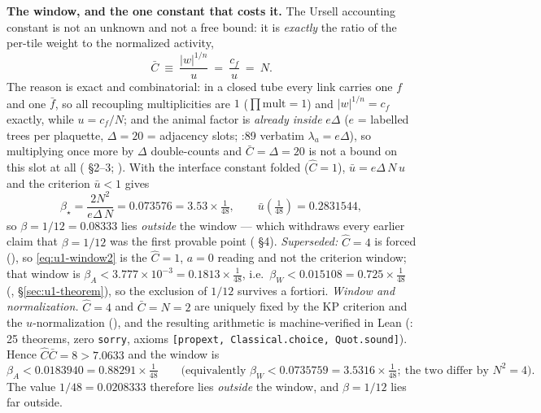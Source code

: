\begin{v2box}
\textbf{The window, and the one constant that costs it.} The Ursell accounting constant is not an
unknown and not a free bound: it is \emph{exactly} the ratio of the per-tile weight to the
normalized activity,
\begin{equation}
\bar C\ \equiv\ \frac{|w|^{1/n}}{u}\ =\ \frac{c_f}{u}\ =\ N .
\label{eq:u1-cbarN}
\end{equation}
The reason is exact and combinatorial: in a closed tube every link carries one $f$ and one $\bar
f$, so all recoupling multiplicities are $1$ ($\prod\mathrm{mult}=1$) and $|w|^{1/n}=c_f$ exactly,
while $u=c_f/N$; and the animal factor is \emph{already inside} $e\Delta$ ($e$ = labelled trees
per plaquette, $\Delta=20$ = adjacency slots; :89 verbatim
$\lambda_a=e\Delta$), so multiplying once more by $\Delta$ double-counts and
$\bar C=\Delta=20$ is not a bound on this slot at all
( \S2--3; ). With the interface constant folded
($\hat C=1$), $\bar u=e\Delta\,N\,u$ and the criterion $\bar u<1$ gives
\begin{equation}
\beta_\star=\frac{2N^2}{e\Delta\,N}=0.073576=3.53\times\tfrac1{48},
\qquad \bar u(\tfrac1{48})=0.2831544 ,
\label{eq:u1-window2}
\end{equation}
so $\beta=1/12=0.08333$ lies \emph{outside} the window --- which withdraws every earlier claim
that $\beta=1/12$ was the first provable point ( \S4). \emph{Superseded:}
$\hat C=4$ is forced (), so \eqref{eq:u1-window2} is the $\hat C=1$, $a=0$
reading and not the criterion window; that window is $\beta_A<3.777\times10^{-3}=0.1813\times\tfrac1{48}$,
i.e.\ $\beta_W<0.015108=0.725\times\tfrac1{48}$ (\LC{}, \S\ref{sec:u1-theorem}), so the exclusion
of $1/12$ survives a fortiori. \emph{Window and normalization.} $\hat C=4$ and $\bar C=N=2$ are
uniquely fixed by the KP criterion and the $u$-normalization (), and the
resulting arithmetic is machine-verified in Lean (: 25 theorems, zero
\texttt{sorry}, axioms \texttt{[propext, Classical.choice, Quot.sound]}). Hence
$\hat C\bar C=8>7.0633$ and the window is
\[
\beta_A<0.0183940=0.88291\times\tfrac1{48}
\qquad\bigl(\text{equivalently }\beta_W<0.0735759=3.5316\times\tfrac1{48};\ \text{the two differ by }N^2=4\bigr).
\]
The value $1/48=0.0208333$ therefore lies \emph{outside} the window, and $\beta=1/12$ lies far
outside.


\end{v2box}
